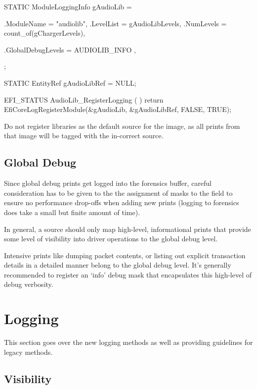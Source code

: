 \begin{SampleCode}
STATIC ModuleLoggingInfo gAudioLib = {
    .ModuleName = "audiolib",
    .LevelList = gAudioLibLevels,
    .NumLevels = count_of(gChargerLevels),

    .GlobalDebugLevels = {
        AUDIOLIB_INFO
    },
};

STATIC EntityRef gAudioLibRef = NULL;

EFI_STATUS 
AudioLib_RegisterLogging (
    )
{
    return EfiCoreLogRegisterModule(&gAudioLib, &gAudioLibRef, FALSE, TRUE);
}
\end{SampleCode}

\begin{Note}
Do not register libraries as the default source for the image, as all prints from that image will be tagged with the in-correct source.
\end{Note}

\subsection{Global Debug}
\label{sec:GlobalDebug}

Since global debug prints get logged into the forensics buffer, careful consideration has to be given to the the assignment of masks to the 
 field to ensure no performance drop-offs when adding new prints (logging to forensics does take a small 
but finite amount of time).

In general, a source should only map high-level, informational prints that provide some level of visibility into driver operations to the 
global debug level. 

Intensive prints like dumping packet contents, or listing out explicit transaction details in a detailed manner  belong to the global 
debug level. It's generally recommended to register an `info' debug mask that encapsulates this high-level of debug verbosity.

\section{Logging}

This section goes over the new logging methods as well as providing guidelines for legacy methods. 

\subsection{Visibility}

